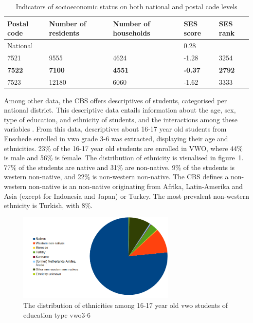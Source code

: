 \begin{table}[]
    \centering
    \begin{tabular}{|p{2cm}|p{2cm}|p{2cm}|p{2cm}|p{2cm}|}
        \hline
        Postal code & Number of residents & Number of households & SES score & SES rank \\ \hline
        National &  &  & 0.28 &  \\ \hline
        7521 & 9555 & 4624 & -1.28 & 3254 \\ \hline
        \textbf{7522} & \textbf{7100} & \textbf{4551} & \textbf{-0.37} & \textbf{2792} \\ \hline
        7523 & 12180 & 6060 & -1.62 & 3333 \\ \hline
    \end{tabular}
    \caption{Indicators of socioeconomic status on both national and postal code levels \protect\cite{scp}}
\label{tab:scpses}
\end{table}


Among other data, the CBS offers descriptives of students, categorised per national district. This descriptive data entails information about the age, sex, type of education, and ethnicity of students, and the interactions among these variables \cite{cbsethn}. From this data, descriptives about 16-17 year old students from Enschede enrolled in vwo grade 3-6 was extracted, displaying their age and ethnicities. 23\% of the 16-17 year old students are enrolled in VWO, where 44\% is male and 56\% is female. The distribution of ethnicity is visualised in figure~\ref{fig:ethnicitychart}. 77\% of the students are native and 31\% are non-native. 9\% of the students is western non-native, and 22\% is non-western non-native. The CBS defines a non-western non-native is an non-native originating from Afrika, Latin-Amerika and Asia (except for Indonesia and Japan) or Turkey. The most prevalent non-western ethnicity is Turkish, with 8\%.

\begin{figure}
    \centering
    \includegraphics[width=0.7\textwidth]{img/ethnicitychart.png}
    \caption{The distribution of ethnicities among 16-17 year old vwo students of education type vwo3-6 \protect\cite{cbsethn}}
    \label{fig:ethnicitychart}
\end{figure}

